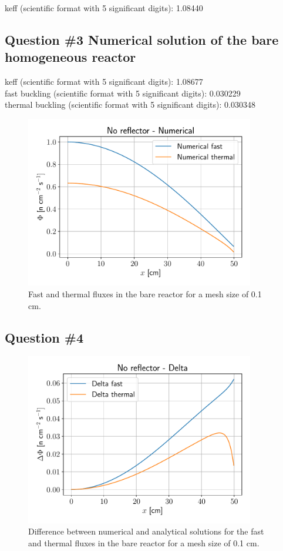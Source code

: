 \documentclass[11pt,a4paper]{article}
\begin{document}
keff (scientific format with 5 significant digits): 1.08440 \\

\subsection{Question \#3 Numerical solution of the bare homogeneous reactor}



keff (scientific format with 5 significant digits): 1.08677 \\

fast buckling (scientific format with 5 significant digits): 0.030229 \\

thermal buckling (scientific format with 5 significant digits): 0.030348 \\

\begin{figure}[H]
	\includegraphics[width=10cm]{fig/Ex3_BarePhi.pdf}
	\centering
	\caption{Fast and thermal fluxes in the bare reactor for a mesh size of 0.1 cm.}
\end{figure}

\subsection{Question \#4}
\begin{figure}[H]
	\includegraphics[width=10cm]{fig/Ex3_BareDelta.pdf}
	\centering
	\caption{Difference between numerical and analytical solutions for the fast and thermal fluxes in the bare reactor for a mesh size of 0.1 cm.}
\end{figure}
\end{document}
